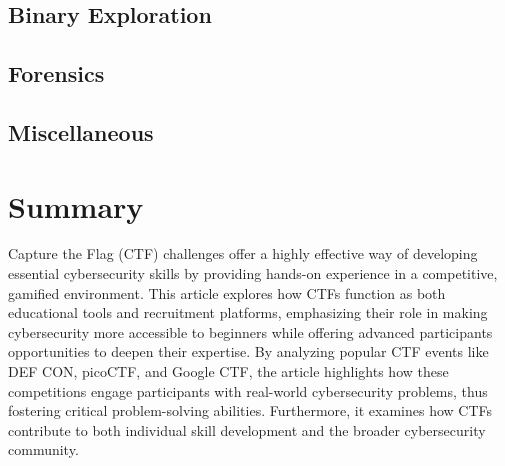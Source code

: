 \documentclass[conference]{IEEEtran}
\begin{document}
\subsection{Binary Exploration}

\subsection{Forensics}

\subsection{Miscellaneous}

\section{Summary}

Capture the Flag (CTF) challenges offer a highly effective way of developing
essential cybersecurity skills by providing hands-on experience in a
competitive, gamified environment. This article explores how CTFs function as
both educational tools and recruitment platforms, emphasizing their role in
making cybersecurity more accessible to beginners while offering advanced
participants opportunities to deepen their expertise. By analyzing popular CTF
events like DEF CON, picoCTF, and Google CTF, the article highlights how these
competitions engage participants with real-world cybersecurity problems, thus
fostering critical problem-solving abilities. Furthermore, it examines how CTFs
contribute to both individual skill development and the broader cybersecurity
community.



\end{document}
